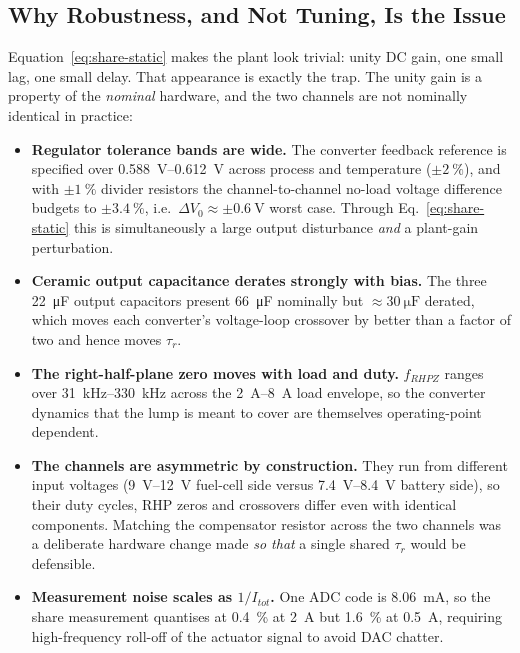 \subsection{Why Robustness, and Not Tuning, Is the Issue}
\label{sec:why-robust}

Equation~\eqref{eq:share-static} makes the plant look trivial: unity DC gain, one small
lag, one small delay. That appearance is exactly the trap. The unity gain is a property
of the \emph{nominal} hardware, and the two channels are not nominally identical in
practice:

\begin{itemize}
\item \textbf{Regulator tolerance bands are wide.} The converter feedback reference is
specified over \SIrange{0.588}{0.612}{\volt} across process and temperature ($\pm\SI{2}{\percent}$),
and with $\pm\SI{1}{\percent}$ divider resistors the channel-to-channel no-load voltage
difference budgets to $\pm\SI{3.4}{\percent}$, i.e.\ $\Delta V_0 \approx \pm\SI{0.6}{\volt}$
worst case. Through Eq.~\eqref{eq:share-static} this is simultaneously a large output
disturbance \emph{and} a plant-gain perturbation.
\item \textbf{Ceramic output capacitance derates strongly with bias.} The three
\SI{22}{\micro\farad} output capacitors present \SI{66}{\micro\farad} nominally but
$\approx\SI{30}{\micro\farad}$ derated, %
which moves each converter's voltage-loop crossover by better than a factor of two and
hence moves $\tau_r$.
\item \textbf{The right-half-plane zero moves with load and duty.} $f_{RHPZ}$ ranges over
\SIrange{31}{330}{\kilo\hertz} across the \SIrange{2}{8}{\ampere} load envelope,
so the converter dynamics that the lump is meant to cover are themselves operating-point
dependent.
\item \textbf{The channels are asymmetric by construction.} They run from different input
voltages (\SIrange{9}{12}{\volt} fuel-cell side versus \SIrange{7.4}{8.4}{\volt} battery
side), %
so their duty cycles, RHP zeros and crossovers differ even with identical components.
Matching the compensator resistor across the two channels was a deliberate hardware
change made \emph{so that} a single shared $\tau_r$ would be defensible.
\item \textbf{Measurement noise scales as $1/I_{tot}$.} One ADC code is
\SI{8.06}{\milli\ampere}, %
so the share measurement quantises at \SI{0.4}{\percent} at \SI{2}{\ampere} but
\SI{1.6}{\percent} at \SI{0.5}{\ampere}, requiring high-frequency roll-off of the actuator
signal to avoid DAC chatter.
\end{itemize}

